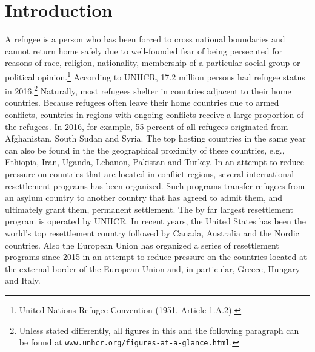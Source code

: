 \documentclass[12pt,fleqn]{article}
\begin{document}
\section{Introduction}
A refugee is a person who has been forced to cross national boundaries and cannot return home safely due to well-founded fear of being persecuted for reasons of race, religion, nationality, membership of a particular social group or political opinion.\footnote{United Nations Refugee Convention (1951, Article 1.A.2).} According to UNHCR, 17.2 million persons had refugee status in 2016.\footnote{Unless stated differently, all figures in this and the following paragraph can be found at \texttt{www.unhcr.org/figures-at-a-glance.html}.} Naturally, most refugees shelter in countries adjacent to their home countries. Because refugees often leave their home countries due to armed conflicts, countries in regions with ongoing conflicts receive a large proportion of the refugees. In 2016, for example, 55 percent of all refugees originated from Afghanistan, South Sudan and Syria. The top hosting countries in the same year can also be found in the the geographical proximity of these countries, e.g., Ethiopia, Iran, Uganda, Lebanon, Pakistan and Turkey. In an attempt to reduce pressure on countries that are located in conflict regions, several international resettlement programs has been organized. Such programs transfer refugees from an asylum country to another country that has agreed to admit them, and ultimately grant them, permanent settlement. The by far largest resettlement program is operated by UNHCR. In recent years, the United States has been the world's top resettlement country followed by Canada, Australia and the Nordic countries. Also the European Union has organized a series of resettlement programs since 2015 in an attempt to reduce pressure on the countries located at the external border of the European Union and, in particular, Greece, Hungary and Italy.
\end{document}
